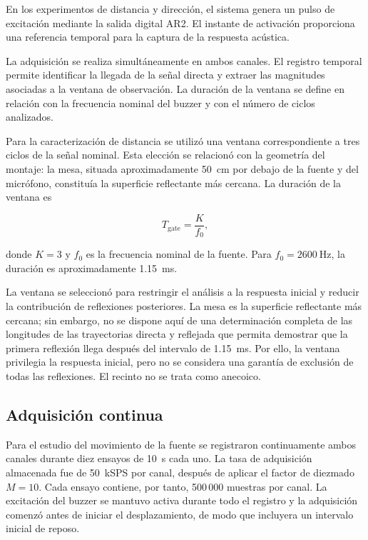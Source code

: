 En los experimentos de distancia y dirección, el sistema genera
un pulso de excitación mediante la salida digital AR2. El instante
de activación proporciona una referencia temporal para la
captura de la respuesta acústica.

La adquisición se realiza simultáneamente en ambos canales.
El registro temporal permite identificar la llegada de la señal
directa y extraer las magnitudes asociadas a la ventana de
observación. La duración de la ventana se define en relación
con la frecuencia nominal del buzzer y con el número de ciclos
analizados.

Para la caracterización de distancia se utilizó una ventana
correspondiente a tres ciclos de la señal nominal. Esta
elección se relacionó con la geometría del montaje: la mesa,
situada aproximadamente \SI{50}{\centi\metre} por debajo
de la fuente y del micrófono, constituía la superficie
reflectante más cercana. La duración de la ventana es

\begin{equation}
    T_{\mathrm{gate}} =
    \frac{K}{f_0},
    \label{eq:ventana_gate_exp}
\end{equation}

donde $K=3$ y $f_0$ es la frecuencia nominal de la fuente.
Para $f_0=\SI{2600}{\hertz}$, la duración es aproximadamente
\SI{1.15}{\milli\second}.

La ventana se seleccionó para restringir el análisis a la
respuesta inicial y reducir la contribución de reflexiones
posteriores. La mesa es la superficie reflectante más cercana;
sin embargo, no se dispone aquí de una determinación completa
de las longitudes de las trayectorias directa y reflejada que
permita demostrar que la primera reflexión llega después del
intervalo de \SI{1.15}{\milli\second}. Por ello, la ventana
privilegia la respuesta inicial, pero no se considera una
garantía de exclusión de todas las reflexiones. El recinto no
se trata como anecoico.

\subsection{Adquisición continua}

Para el estudio del movimiento de la fuente se registraron
continuamente ambos canales durante diez ensayos de
\SI{10}{\second} cada uno. La tasa de adquisición almacenada
fue de \SI{50}{kSPS} por canal, después de aplicar el factor
de diezmado $M=10$. Cada ensayo contiene, por tanto,
500\,000 muestras por canal. La excitación del buzzer se
mantuvo activa durante todo el registro y la adquisición
comenzó antes de iniciar el desplazamiento, de modo que
incluyera un intervalo inicial de reposo.


